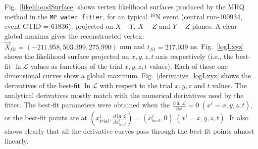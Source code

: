 Fig.~\ref{likelihoodSurface} shows vertex likelihood surfaces produced by the MRQ method in the \texttt{MP water fitter}, for an typical {$^{16}$}N event (central run-100934, event GTID = 61836), projected on $X-Y$, $X-Z$ and $Y-Z$ planes. A clear global maxima gives the reconstructed vertex: $\vec{X}_{fit}=(-211.958, 503.399, 275.990)$ mm and $t_{fit}=217.039$ ns. Fig.~\ref{logLxyz} shows the likelihood surface projected on $x,y,z,t$-axis respectively (i.e., the best-fit $\ln \mathcal{L}$ values as functions of the trial $x,y,z,t$ values). Each of these one dimensional curves show a global maximum. Fig.~\ref{derivative_logLxyz} shows the derivatives of the best-fit $\ln \mathcal{L}$ with respect to the trial $x,y,z$ and $t$ values. The analytical derivatives mostly match with the numerical derivatives used by the fitter. The best-fit parameters were obtained when the $\frac{\partial \ln \mathcal{L}}{\partial x^i} = 0\; (x^i = x,y,z,t)$, or the best-fit points are at $(x^i_{trial},\frac{\partial \ln \mathcal{L}}{\partial x^i_{trial}} )=(x^i_{best},0)\; (x^i = x,y,z,t)$. It also shows clearly that all the derivative curves pass through the best-fit points almost linearly.

